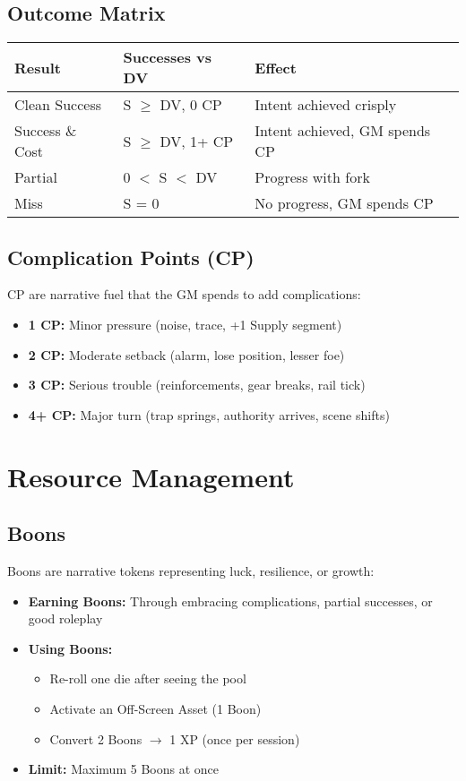 \documentclass[11pt]{article}
\begin{document}
\subsection{Outcome Matrix}

\begin{tabular}{|l|l|l|}
\hline
\textbf{Result} & \textbf{Successes vs DV} & \textbf{Effect} \\
\hline
Clean Success & S $\geq$ DV, 0 CP & Intent achieved crisply \\
Success \& Cost & S $\geq$ DV, 1+ CP & Intent achieved, GM spends CP \\
Partial & 0 $<$ S $<$ DV & Progress with fork \\
Miss & S = 0 & No progress, GM spends CP \\
\hline
\end{tabular}

\subsection{Complication Points (CP)}

CP are narrative fuel that the GM spends to add complications:
\begin{itemize}
\item \textbf{1 CP:} Minor pressure (noise, trace, +1 Supply segment)
\item \textbf{2 CP:} Moderate setback (alarm, lose position, lesser foe)
\item \textbf{3 CP:} Serious trouble (reinforcements, gear breaks, rail tick)
\item \textbf{4+ CP:} Major turn (trap springs, authority arrives, scene shifts)
\end{itemize}

\section{Resource Management}

\subsection{Boons}

Boons are narrative tokens representing luck, resilience, or growth:
\begin{itemize}
\item \textbf{Earning Boons:} Through embracing complications, partial successes, or good roleplay
\item \textbf{Using Boons:}
   \begin{itemize}
   \item Re-roll one die after seeing the pool
   \item Activate an Off-Screen Asset (1 Boon)
   \item Convert 2 Boons $\rightarrow$ 1 XP (once per session)
   \end{itemize}
\item \textbf{Limit:} Maximum 5 Boons at once
\end{itemize}
\end{document}
